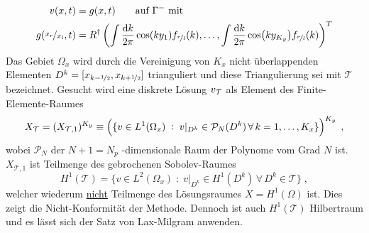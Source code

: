 \begin{equation}
  \begin{aligned}
    v(x,t) &= g(x,t) \qquad \text{auf }{\Gamma^-} \text{ mit} \\
    g(\nicefrac{x_r}{x_l},t) &= R^{\dagger} \left(\int \frac{\mathop{}\!\mathrm{d} k}{2\pi} \cos(ky_1)     f_{\nicefrac{r}{l}} (k), \dots,
                                            \int \frac{\mathop{}\!\mathrm{d} k}{2\pi} \cos(ky_{K_y}) f_{\nicefrac{r}{l}} (k)\right)^T
  \end{aligned}
  \label{eq:RB_g}
\end{equation}
Das Gebiet $\Omega_x$ wird durch die Vereinigung von $K_x$ nicht überlappenden Elementen ${D^k = [x_{k-\nicefrac{1}{2}} , x_{k+\nicefrac{1}{2}}]}$ trianguliert und diese Triangulierung sei mit $\mathcal{T}$ bezeichnet. Gesucht wird eine diskrete Lösung $v_{\mathcal{T}}$ als Element des Finite-Elemente-Raumes
\begin{equation}
  X_{\mathcal{T}} = (X_{\mathcal{T},1})^{K_y} \equiv \left( \{ v \in L^1(\Omega_x) \; : \; v\rvert_{D^k} \in \mathcal{P}_N(D^k) \, \forall \, k=1,\dots,K_x \} \right)^{K_y} \; ,
  \label{eq:FES}
\end{equation}
wobei $\mathcal{P}_N$ der ${N+1=N_p}$ -dimensionale Raum der Polynome vom Grad $N$ ist. $X_{\mathcal{T},1}$ ist Teilmenge des gebrochenen Sobolev-Raumes
\begin{equation*}
    H^1(\mathcal{T}) = \{ v \in L^2(\Omega_x) \; : \; v|_{D^k} \in H^1(D^k) \, \forall \, D^k \in \mathcal{T} \} \; ,
\end{equation*}
welcher wiederum \underline{nicht} Teilmenge des Lösungsraumes $X=H^1(\Omega)$ ist. Dies zeigt die Nicht-Konformität der Methode. Dennoch ist auch $H^1(\mathcal{T})$ Hilbertraum und es lässt sich der Satz von Lax-Milgram anwenden.

